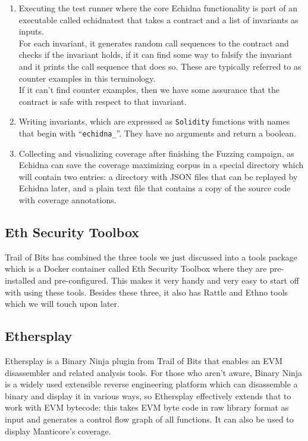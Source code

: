 \begin{enumerate}
\def\labelenumi{\arabic{enumi}.}
\item
  Executing the test runner where the core Echidna functionality is part
  of an executable called echidnatest that takes a contract and a list
  of invariants as inputs.\\

  For each invariant, it generates random call sequences to the contract
  and checks if the invariant holds, if it can find some way to falsify
  the invariant and it prints the call sequence that does so. These are
  typically referred to as counter examples in this terminology.\\

  If it can't find counter examples, then we have some assurance that
  the contract is safe with respect to that invariant.
\item
  Writing invariants, which are expressed as \texttt{Solidity} functions
  with names that begin with ``\texttt{echidna\_}''. They have no
  arguments and return a boolean.
\item
  Collecting and visualizing coverage after finishing the Fuzzing
  campaign, as Echidna can save the coverage maximizing corpus in a
  special directory which will contain two entries: a directory with
  JSON files that can be replayed by Echidna later, and a plain text
  file that contains a copy of the source code with coverage
  annotations.
\end{enumerate}

\subsection{Eth Security Toolbox}\label{eth-security-toolbox}

Trail of Bits has combined the three tools we just discussed into a
tools package which is a Docker container called Eth Security Toolbox
where they are pre-installed and pre-configured. This makes it very
handy and very easy to start off with using these tools. Besides these
three, it also has Rattle and Ethno tools which we will touch upon
later.

\subsection{Ethersplay}\label{ethersplay}

Ethersplay is a Binary Ninja plugin from Trail of Bits that enables an
EVM disassembler and related analysis tools. For those who aren't aware,
Binary Ninja is a widely used extensible reverse engineering platform
which can disassemble a binary and display it in various ways, so
Ethersplay effectively extends that to work with EVM bytecode: this
takes EVM byte code in raw library format as input and generates a
control flow graph of all functions. It can also be used to display
Manticore's coverage.

